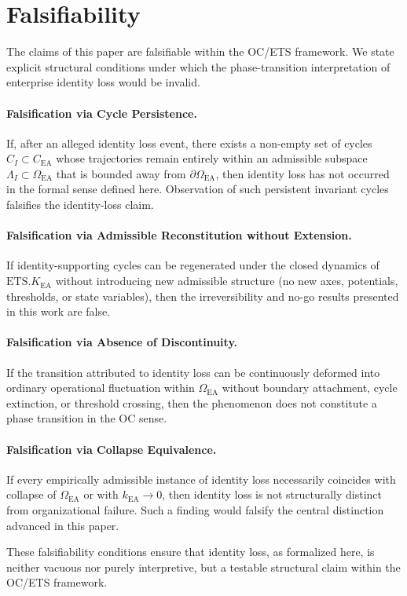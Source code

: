 ﻿\section{Falsifiability}

The claims of this paper are falsifiable within the OC/ETS framework. We state
explicit structural conditions under which the phase-transition interpretation
of enterprise identity loss would be invalid.

\paragraph{Falsification via Cycle Persistence.}
If, after an alleged identity loss event, there exists a non-empty set of cycles
$C_I \subset C_{\mathrm{EA}}$ whose trajectories remain entirely within an
admissible subspace $\Lambda_I \subset \Omega_{\mathrm{EA}}$ that is bounded away
from $\partial\Omega_{\mathrm{EA}}$, then identity loss has not occurred in the
formal sense defined here. Observation of such persistent invariant cycles
falsifies the identity-loss claim.

\paragraph{Falsification via Admissible Reconstitution without Extension.}
If identity-supporting cycles can be regenerated under the closed dynamics of
$\mathrm{ETS}.K_{\mathrm{EA}}$ without introducing new admissible structure (no
new axes, potentials, thresholds, or state variables), then the irreversibility
and no-go results presented in this work are false.

\paragraph{Falsification via Absence of Discontinuity.}
If the transition attributed to identity loss can be continuously deformed into
ordinary operational fluctuation within $\Omega_{\mathrm{EA}}$ without boundary
attachment, cycle extinction, or threshold crossing, then the phenomenon does
not constitute a phase transition in the OC sense.

\paragraph{Falsification via Collapse Equivalence.}
If every empirically admissible instance of identity loss necessarily coincides
with collapse of $\Omega_{\mathrm{EA}}$ or with $k_{\mathrm{EA}} \rightarrow 0$,
then identity loss is not structurally distinct from organizational failure.
Such a finding would falsify the central distinction advanced in this paper.

These falsifiability conditions ensure that identity loss, as formalized here,
is neither vacuous nor purely interpretive, but a testable structural claim
within the OC/ETS framework.
